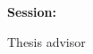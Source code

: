 \begin{titlepage}
    \begin{center}
        \large
        \MakeUppercase{\university}
        
        \LARGE
        \textbf{\MakeUppercase{\faculty}}
        
        \vspace{8cm}
        \huge
        \textbf{\thesistitle}
        
        \vspace{2cm}
        \LARGE
        \textbf{\authornamefl}
        
        \vfill
        \Large
        \textbf{Session:} \session
        
        \vspace{4cm}
        \Large
        Thesis advisor
        
        \vspace{0.5cm}
        \LARGE
        \textbf{\coordinator}
    \end{center}
\end{titlepage}